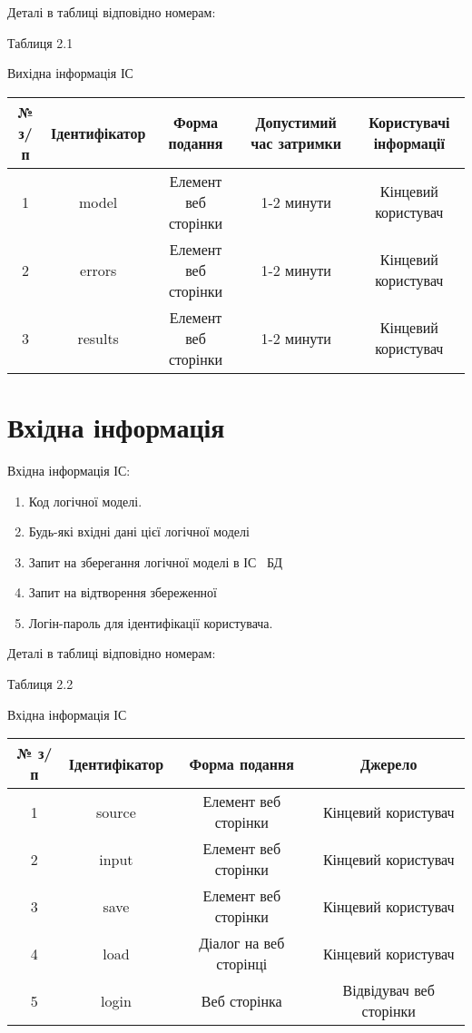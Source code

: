 Деталі в таблиці відповідно номерам:

\begin{flushright}\small {Таблиця 2.1} \end{flushright}
\begin{center}
Вихідна інформація ІС
\small{
\begin{tabular}{ | c | c | c | c | c | }
\hline
 № з/п  & Ідентифікатор & Форма подання & Допустимий час затримки & Користувачі інформації \\ 
\hline
 1 & model & Елемент веб сторінки & 1-2 минути & Кінцевий користувач \\  
\hline
 2 & errors & Елемент веб сторінки & 1-2 минути & Кінцевий користувач \\  
\hline
 3 & results & Елемент веб сторінки & 1-2 минути & Кінцевий користувач \\  
\hline
\end{tabular}
}
\end{center}


\section{Вхідна інформація}

Вхідна інформація ІС: 

\begin{enumerate}
	\item Код логічної моделі.
	\item Будь-які вхідні дані цієї логічної моделі
	\item Запит на зберегання логічної моделі в ІС \ БД
	\item Запит на відтворення збереженної 
	\item Логін-пароль для ідентифікації користувача.
\end{enumerate}

Деталі в таблиці відповідно номерам:

\begin{flushright}\small {Таблиця 2.2} \end{flushright}
\begin{center}
Вхідна інформація ІС
\small{
\begin{tabular}{ | c | c | c | c |  }
\hline
 № з/п  & Ідентифікатор & Форма подання & Джерело \\ 
\hline
 1 & source & Елемент веб сторінки & Кінцевий користувач \\  
\hline
 2 & input & Елемент веб сторінки & Кінцевий користувач \\  
\hline
 3 & save & Елемент веб сторінки & Кінцевий користувач \\  
\hline
 4 & load & Діалог на веб сторінці & Кінцевий користувач \\  
\hline
 5 & login & Веб сторінка & Відвідувач веб сторінки \\  
\hline
\end{tabular}
}
\end{center}


